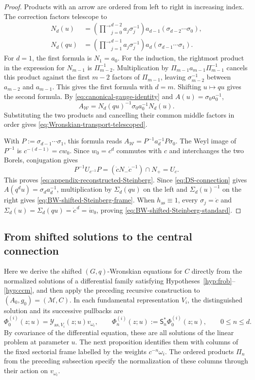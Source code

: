 \documentclass[11pt,leqno]{amsart}
\numberwithin{equation}{section}
\theoremstyle{plain}
\theoremstyle{definition}
\theoremstyle{plain}
\theoremstyle{definition}
\theoremstyle{remark}
\begin{document}
\begin{proof}
Products with an arrow are ordered from left to right in increasing index.  The correction factors telescope to
\begin{align}
 N_d(u)
 &=\left(\overrightarrow{\prod}_{j=0}^{d-2}a_j\sigma_j^{-1}\right)
   a_{d-1}(\sigma_{d-2}\cdots \sigma_0),
 \label{eq:canonical-correction-telescoped}\\
 N_d(qu)
 &=\left(\overrightarrow{\prod}_{j=1}^{d-1}a_j\sigma_j^{-1}\right)
   a_d(\sigma_{d-1}\cdots \sigma_1).
 \label{eq:canonical-correction-shifted-telescoped}
\end{align}
For $d=1$, the first formula is $N_1=a_0$.  For the induction, the rightmost product in the expression for $N_{m-1}$ is $\Pi_{m-2}^{-1}$.  Multiplication by $\Pi_{m-1}a_{m-1}\Pi_{m-1}^{-1}$ cancels this product against the first $m-2$ factors of $\Pi_{m-1}$, leaving $\sigma_{m-2}^{-1}$ between $a_{m-2}$ and $a_{m-1}$.  This gives the first formula with $d=m$.  Shifting $u\mapsto qu$ gives the second formula.  By \eqref{eq:canonical-gauge-identity} and $A(u)=\sigma_0a_0^{-1}$,
\[
 A_{\mathscr W}
 =N_d(qu)^{-1}\sigma_0a_0^{-1}N_d(u).
\]
Substituting the two products and cancelling their common middle factors in order gives \eqref{eq:Wronskian-transport-telescoped}.

With $P:=\sigma_{d-1}\cdots\sigma_1$, this formula reads $A_{\mathscr W}=P^{-1}a_d^{-1}P\sigma_0$.  The Weyl image of $P^{-1}$ is $c^{-(d-1)}=cw_0$.  Since $w_0=c^d$ commutes with $c$ and interchanges the two Borels, conjugation gives
\[
 P^{-1}U_{c^{-1}}P
 =(\dot cN_-\dot c^{-1})\cap N_+=U_c.
\]
This proves \eqref{eq:appendix-reconstructed-Steinberg}.  Since \eqref{eq:DS-connection} gives $A(q^du)=\sigma_da_d^{-1}$, multiplication by $\Sigma_d(qu)$ on the left and $\Sigma_d(u)^{-1}$ on the right gives \eqref{eq:BW-shifted-Steinberg-frame}.  When $h_{\mathrm{as}}\equiv1$, every $\sigma_j=\dot c$ and $\Sigma_d(u)=\Sigma_d(qu)=\dot c^{\,d}=\dot w_0$, proving \eqref{eq:BW-shifted-Steinberg-standard}.
\end{proof}

\subsection{From shifted solutions to the central connection}
Here we derive the shifted $(G,q)$-Wronskian equations for $C$ directly from the normalized solutions of a differential family satisfying Hypotheses~\ref{hyp:frob}--\ref{hyp:ccm}, and then apply the preceding recursive construction to $(A_0,g_0)=(\mathscr M,C)$.  In each fundamental representation $V_i$, the distinguished solution and its successive pullbacks are
\[
 \Phi_0^{(i)}(z;u)=\mathcal Y_{\mathrm{as},V_i}(z;u)v_{\omega_i},
 \qquad
 \Phi_n^{(i)}(z;u):=\mathsf S_n^*\Phi_0^{(i)}(z;u),
 \qquad 0\le n\le d.
\]
By covariance of the differential equation, these are all solutions of the linear problem at parameter $u$.  The next proposition identifies them with columns of the fixed sectorial frame labelled by the weights $c^{-n}\omega_i$.  The ordered products $\Pi_n$ from the preceding subsection specify the normalization of these columns through their action on $v_{\omega_i}$.
\end{document}
